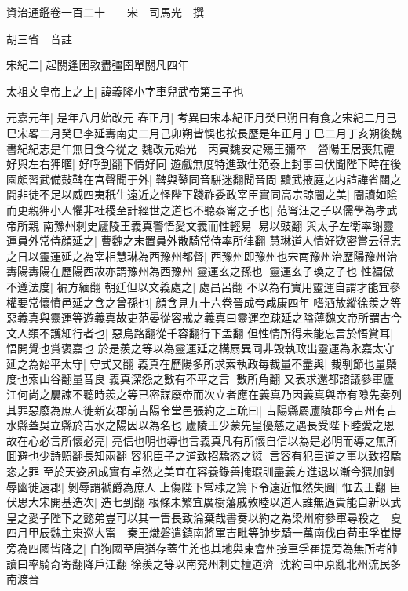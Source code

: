 資治通鑑卷一百二十　　宋　司馬光　撰

胡三省　音註

宋紀二|{
	起閼逢困敦盡彊圉單閼凡四年}


太祖文皇帝上之上|{
	諱義隆小字車兒武帝第三子也}


元嘉元年|{
	是年八月始改元}
春正月|{
	考異曰宋本紀正月癸巳朔日有食之宋紀二月己巳宋畧二月癸巳李延夀南史二月己卯朔皆悞也按長歷是年正月丁巳二月丁亥朔後魏書紀紀志是年無日食今從之}
魏改元始光　丙寅魏安定殤王彌卒　營陽王居喪無禮好與左右狎暱|{
	好呼到翻下情好同}
遊戲無度特進致仕范泰上封事曰伏聞陛下時在後園頗習武備鼔鞞在宫聲聞于外|{
	鞞與鼙同音駢迷翻聞音問}
黷武掖庭之内諠譁省闥之間非徒不足以威四夷秖生遠近之怪陛下踐祚委政宰臣實同高宗諒闇之美|{
	闇讀如隂}
而更親狎小人懼非社稷至計經世之道也不聽泰甯之子也|{
	范甯汪之子以儒學為孝武帝所親}
南豫州刺史廬陵王義真警悟愛文義而性輕易|{
	易以豉翻}
與太子左衛率謝靈運員外常侍顔延之|{
	曹魏之末置員外散騎常侍率所律翻}
慧琳道人情好欵密嘗云得志之日以靈運延之為宰相慧琳為西豫州都督|{
	西豫州即豫州也宋南豫州治歷陽豫州治夀陽夀陽在歷陽西故亦謂豫州為西豫州}
靈運玄之孫也|{
	靈運玄子瑍之子也}
性褊傲不遵法度|{
	褊方緬翻}
朝廷但以文義處之|{
	處昌呂翻}
不以為有實用靈運自謂才能宜參權要常懷憤邑延之含之曾孫也|{
	顔含見九十六卷晉成帝咸康四年}
嗜酒放縱徐羨之等惡義真與靈運等遊義真故吏范晏從容戒之義真曰靈運空疎延之隘薄魏文帝所謂古今文人類不護細行者也|{
	惡烏路翻從千容翻行下孟翻}
但性情所得未能忘言於悟賞耳|{
	悟開覺也賞褒嘉也}
於是羨之等以為靈運延之構扇異同非毁執政出靈運為永嘉太守延之為始平太守|{
	守式又翻}
義真在歷陽多所求索執政每裁量不盡與|{
	裁剸節也量槩度也索山谷翻量音良}
義真深怨之數有不平之言|{
	數所角翻}
又表求還都諮議參軍廬江何尚之屢諫不聽時羨之等已密謀廢帝而次立者應在義真乃因義真與帝有隙先奏列其罪惡廢為庶人徙新安郡前吉陽令堂邑張約之上疏曰|{
	吉陽縣屬廬陵郡今吉州有吉水縣蓋吳立縣於吉水之陽因以為名也}
廬陵王少蒙先皇優慈之遇長受陛下睦愛之恩故在心必言所懷必亮|{
	亮信也明也導也言義真凡有所懷自信以為是必明而導之無所囬避也少詩照翻長知兩翻}
容犯臣子之道致招驕恣之愆|{
	言容有犯臣道之事以致招驕恣之罪}
至於天姿夙成實有卓然之美宜在容養錄善掩瑕訓盡義方進退以漸今猥加剝辱幽徙遠郡|{
	剝辱謂褫爵為庶人}
上傷陛下常棣之篤下令遠近恇然失圖|{
	恇去王翻}
臣伏思大宋開基造次|{
	造七到翻}
根條未繁宜廣樹藩戚敦睦以道人誰無過貴能自新以武皇之愛子陛下之懿弟豈可以其一眚長致淪棄哉書奏以約之為梁州府參軍尋殺之　夏四月甲辰魏主東巡大甯　秦王熾磐遣鎮南將軍吉毗等帥步騎一萬南伐白苟車孚崔提旁為四國皆降之|{
	白狗國至唐猶存蓋生羌也其地與東會州接車孚崔提旁為無所考帥讀曰率騎奇寄翻降戶江翻}
徐羨之等以南兖州刺史檀道濟|{
	沈約曰中原亂北州流民多南渡晉}


